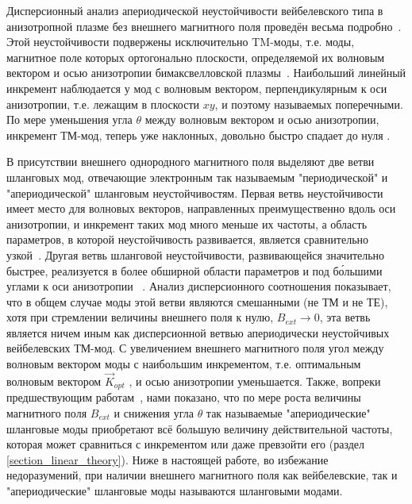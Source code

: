 Дисперсионный анализ апериодической неустойчивости вейбелевского типа в анизотропной плазме без внешнего магнитного поля проведён весьма подробно~\cite{Weibel1959,Zhou2022,Fried1959,Kalman1968,Morse1971,Kocharovsky2016,Lazar2006,Stockem2009,SchaeferRolffs2006}. Этой неустойчивости подвержены исключительно TM-моды, т.е. моды, магнитное поле которых ортогонально плоскости, определяемой их волновым вектором и осью анизотропии бимаксвелловской плазмы~\cite{Vagin2014}. Наибольший линейный инкремент наблюдается у мод с волновым вектором, перпендикулярным к оси анизотропии, т.е. лежащим в плоскости $xy$, и поэтому называемых поперечными. По мере уменьшения угла $\theta$ между волновым вектором и осью анизотропии, инкремент ТМ-мод, теперь уже наклонных, довольно быстро спадает до нуля \cite{???}. 

В присутствии внешнего однородного магнитного поля выделяют две ветви шланговых мод, отвечающие электронным так называемым "периодической" и "апериодической" шланговым неустойчивостям. 
Первая ветвь неустойчивости имеет место для волновых векторов, направленных преимущественно вдоль оси анизотропии, и инкремент таких мод много меньше их частоты, а область параметров, в которой неустойчивость развивается, является сравнительно узкой~\cite{??}. 
Другая ветвь шланговой неустойчивости, развивающейся значительно быстрее, реализуется в более обширной области параметров и под б\'{о}льшими углами к оси анизотропии ~\cite{Li2000,Camporeale2008,Lazar2013,Moya2022}. 
Анализ дисперсионного соотношения показывает, что в общем случае моды этой ветви являются смешанными (не ТМ и не ТЕ), хотя при стремлении величины внешнего поля  к нулю, $B_{ext}\rightarrow0$, эта ветвь является ничем иным как дисперсионной ветвью апериодически неустойчивых вейбелевских ТМ-мод. 
С увеличением внешнего магнитного поля угол между волновым вектором моды с наибольшим инкрементом, т.е. оптимальным волновым вектором $\overrightarrow{K}_{opt}$ , и осью анизотропии уменьшается. Также, вопреки предшествующим работам~\cite{??}, нами показано, что  по мере роста величины магнитного поля $B_{ext}$ и снижения угла $\theta$ так называемые "апериодические" шланговые моды приобретают всё большую величину действительной частоты, которая может сравниться с инкрементом или даже превзойти его (раздел \ref{section_linear_theory}). 
Ниже в настоящей работе, во избежание недоразумений, при наличии внешнего магнитного поля как вейбелевские, так и "апериодические" шланговые моды называются шланговыми модами.

